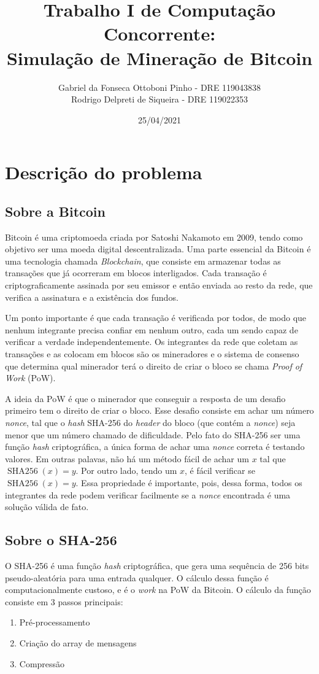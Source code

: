 \documentclass[12pt]{article}
\author{Gabriel da Fonseca Ottoboni Pinho - DRE 119043838\\
Rodrigo Delpreti de Siqueira - DRE 119022353}
\title{Trabalho I de Computação Concorrente: \\Simulação de Mineração de Bitcoin}
\date{25/04/2021}
\DeclareMathOperator{\sha}{SHA256}
\begin{document}
\maketitle
\newpage
\tableofcontents
\newpage

\section{Descrição do problema}
\subsection{Sobre a Bitcoin}
Bitcoin é uma criptomoeda criada por Satoshi Nakamoto em 2009,
tendo como objetivo ser uma moeda digital descentralizada.
Uma parte essencial da Bitcoin é uma tecnologia chamada \textit{Blockchain},
que consiste em armazenar todas as transações que já ocorreram
em blocos interligados.
Cada transação é criptograficamente assinada por seu emissor
e então enviada ao resto da rede,
que verifica a assinatura e a existência dos fundos.

Um ponto importante é que cada transação é verificada por todos,
de modo que nenhum integrante precisa confiar em nenhum outro,
cada um sendo capaz de verificar a verdade independentemente.
Os integrantes da rede que coletam as transações
e as colocam em blocos são os mineradores
e o sistema de consenso que determina qual minerador
terá o direito de criar o bloco se chama \textit{Proof of Work} (PoW).

A ideia da PoW é que o minerador que conseguir
a resposta de um desafio primeiro
tem o direito de criar o bloco.
Esse desafio consiste em achar um número \textit{nonce},
tal que o \textit{hash} SHA-256 do \textit{header} do bloco
(que contém a \textit{nonce})
seja menor que um número chamado de dificuldade.
Pelo fato do SHA-256 ser uma função \textit{hash} criptográfica,
a única forma de achar uma \textit{nonce} correta é
testando valores.
Em outras palavas, não há um método fácil de achar
um $x$ tal que $\sha(x) = y$.
Por outro lado, tendo um $x$,
é fácil verificar se $\sha(x) = y$.
Essa propriedade é importante,
pois, dessa forma, todos os integrantes da rede podem
verificar facilmente se a \textit{nonce} encontrada
é uma solução válida de fato.

\subsection{Sobre o SHA-256}
O SHA-256 é uma função \textit{hash} criptográfica,
que gera uma sequência de 256 bits pseudo-aleatória
para uma entrada qualquer.
O cálculo dessa função é computacionalmente custoso,
e é o \textit{work} na PoW da Bitcoin.
O cálculo da função consiste em 3 passos principais:
\begin{enumerate}
	\item Pré-processamento
	\item Criação do array de mensagens
	\item Compressão
\end{enumerate}
\end{document}
